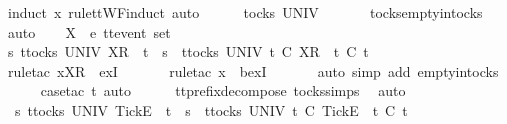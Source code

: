 \begin{isabellebody}
%
\isadelimproof
%
\endisadelimproof
%
\isatagproof
{}\isamarkupfalse%
\ {\isacharparenleft}induct\ x\ rule{\isacharcolon}ttWF{\isachardot}induct{\isacharcomma}\ auto{\isacharparenright}\isanewline
\ \ \isamarkupfalse%
\ {\isachardoublequoteopen}{\isacharbrackleft}{\isacharbrackright}\ {\isasymin}\ tocks\ UNIV{\isachardoublequoteclose}\ \isanewline
\ \ \ \ \isamarkupfalse%
\ tocks{\isachardot}empty{\isacharunderscore}in{\isacharunderscore}tocks\ \isamarkupfalse%
\ auto\isanewline
{}\isamarkupfalse%
\isanewline
\ \ \isamarkupfalse%
\ X\ {\isacharcolon}{\isacharcolon}\ {\isachardoublequoteopen}{\isacharprime}e\ ttevent\ set{\isachardoublequoteclose}\isanewline
\ \ \isamarkupfalse%
\ {\isachardoublequoteopen}{\isasymexists}s{\isachardot}\ {\isasymexists}t{\isasymin}tocks\ UNIV{\isachardot}\ {\isacharbrackleft}{\isacharbrackleft}X{\isacharbrackright}\isactrlsub R{\isacharbrackright}\ {\isacharequal}\ t\ {\isacharat}\ s\ {\isasymand}\ {\isacharparenleft}{\isasymforall}t{\isacharprime}{\isasymin}tocks\ UNIV{\isachardot}\ t{\isacharprime}\ {\isasymle}\isactrlsub C\ {\isacharbrackleft}{\isacharbrackleft}X{\isacharbrackright}\isactrlsub R{\isacharbrackright}\ {\isasymlongrightarrow}\ t{\isacharprime}\ {\isasymle}\isactrlsub C\ t{\isacharparenright}{\isachardoublequoteclose}\isanewline
\ \ \ \ \isamarkupfalse%
\ {\isacharparenleft}rule{\isacharunderscore}tac\ x{\isacharequal}{\isachardoublequoteopen}{\isacharbrackleft}{\isacharbrackleft}X{\isacharbrackright}\isactrlsub R{\isacharbrackright}{\isachardoublequoteclose}\ \ exI{\isacharparenright}\ \isanewline
\ \ \ \ \isamarkupfalse%
\ {\isacharparenleft}rule{\isacharunderscore}tac\ x{\isacharequal}{\isachardoublequoteopen}{\isacharbrackleft}{\isacharbrackright}{\isachardoublequoteclose}\ \ bexI{\isacharparenright}\isanewline
\ \ \ \ \ \isamarkupfalse%
\ {\isacharparenleft}auto\ simp\ add{\isacharcolon}\ empty{\isacharunderscore}in{\isacharunderscore}tocks{\isacharparenright}\isanewline
\ \ \ \ \isamarkupfalse%
\ {\isacharparenleft}case{\isacharunderscore}tac\ t{\isacharprime}{\isacharcomma}\ auto{\isacharparenright}\isanewline
\ \ \ \ \isamarkupfalse%
\ tt{\isacharunderscore}prefix{\isacharunderscore}decompose\ tocks{\isachardot}simps\ \isamarkupfalse%
\ auto\isanewline
{}\isamarkupfalse%
\isanewline
\ \ \isamarkupfalse%
\ {\isachardoublequoteopen}\ {\isasymexists}s{\isachardot}\ {\isasymexists}t{\isasymin}tocks\ UNIV{\isachardot}\ {\isacharbrackleft}{\isacharbrackleft}Tick{\isacharbrackright}\isactrlsub E{\isacharbrackright}\ {\isacharequal}\ t\ {\isacharat}\ s\ {\isasymand}\ {\isacharparenleft}{\isasymforall}t{\isacharprime}{\isasymin}tocks\ UNIV{\isachardot}\ t{\isacharprime}\ {\isasymle}\isactrlsub C\ {\isacharbrackleft}{\isacharbrackleft}Tick{\isacharbrackright}\isactrlsub E{\isacharbrackright}\ {\isasymlongrightarrow}\ t{\isacharprime}\ {\isasymle}\isactrlsub C\ t{\isacharparenright}{\isachardoublequoteclose}\isanewline

\end{isabellebody}
